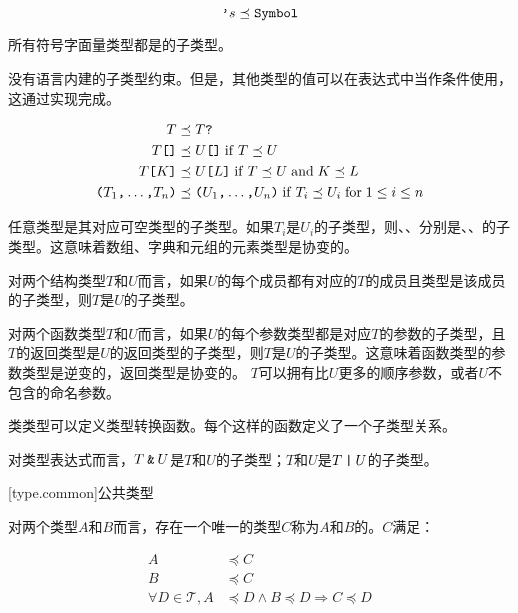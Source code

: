 $$ \texttt{'}s \preceq \texttt{Symbol} $$

\pnum
所有符号字面量类型都是的子类型。

\pnum
{}没有语言内建的子类型约束。但是，其他类型的值可以在表达式中当作条件使用，这通过实现完成。

\begin{equation*}
\begin{aligned}
T &\preceq T\texttt{?} \\
T\texttt{[]} &\preceq U\texttt{[]} \mathrel{\mathrm{if}} T \preceq U \\
T\texttt{[}K\texttt{]} &\preceq U\texttt{[}L\texttt{]} \mathrel{\mathrm{if}} T \preceq U \mathrel{\mathrm{and}} K \preceq L \\
\texttt{(}T_1\texttt{,} \ldots\texttt{,} T_n\texttt{)} &\preceq \texttt{(}U_1\texttt{,} \ldots\texttt{,} U_n\texttt{)} \mathrel{\mathrm{if}} T_i \preceq U_i \mathrel{\mathrm{for}} 1 \leq i \leq n \\
\end{aligned}
\end{equation*}

\pnum
任意类型是其对应可空类型的子类型。如果$T_i$是$U_i$的子类型，则、、分别是、、的子类型。\enternote 这意味着数组、字典和元组的元素类型是协变的。 \exitnote

\pnum
对两个结构类型$T$和$U$而言，如果$U$的每个成员都有对应的$T$的成员且类型是该成员的子类型，则$T$是$U$的子类型。

\pnum
对两个函数类型$T$和$U$而言，如果$U$的每个参数类型都是对应$T$的参数的子类型，且$T$的返回类型是$U$的返回类型的子类型，则$T$是$U$的子类型。\enternote 这意味着函数类型的参数类型是逆变的，返回类型是协变的。 \exitnote $T$可以拥有比$U$更多的顺序参数，或者$U$不包含的命名参数。

\pnum
类类型可以定义类型转换函数。每个这样的函数定义了一个子类型关系。

\pnum
对类型表达式而言，$T\mathbin{\texttt{\&}}U$是$T$和$U$的子类型；$T$和$U$是$T\mathbin{\texttt{|}}U$的子类型。

[type.common]{公共类型}

\pnum
对两个类型$A$和$B$而言，存在一个唯一的类型$C$称为$A$和$B$的。$C$满足：

\begin{equation}
\begin{aligned}
    A &\preceq C \\
    B &\preceq C \\
    \forall D \in \mathcal{T}, A &\preceq D \land B \preceq D \Rightarrow C \preceq D
\end{aligned}
\end{equation}


